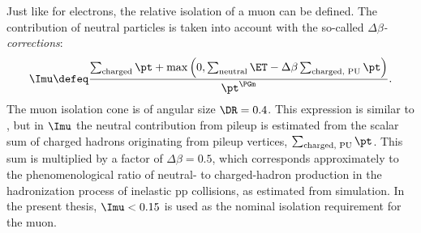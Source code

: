 %

Just like for electrons, the relative isolation of a muon can be defined.
The contribution of neutral particles is taken into account with the so-called \emph{$\Delta\beta$-corrections}:
\begin{equation}\label{eq:iso_mu}
  \Imu \defeq
    \frac{\sum_\text{charged} \pt + \max\left( 0, \sum_\text{neutral} \ET
                                  - \Delta\beta \sum_\text{charged, PU} \pt \right )}{\pt^{\PGm}}.
\end{equation}
The muon isolation cone is of angular size $\DR=0.4$.
This expression is similar to , but in $\Imu$ the neutral contribution from pileup is estimated from the scalar {\pt} sum of charged hadrons originating from pileup vertices, $\sum_\text{charged, PU} \pt$. This sum is multiplied by a factor of $\Delta\beta = 0.5$, which corresponds approximately to the phenomenological ratio of neutral- to charged-hadron production in the hadronization process of inelastic pp collisions, as estimated from simulation.
In the present thesis, $\Imu < 0.15$ is used as the nominal isolation requirement for the muon.



